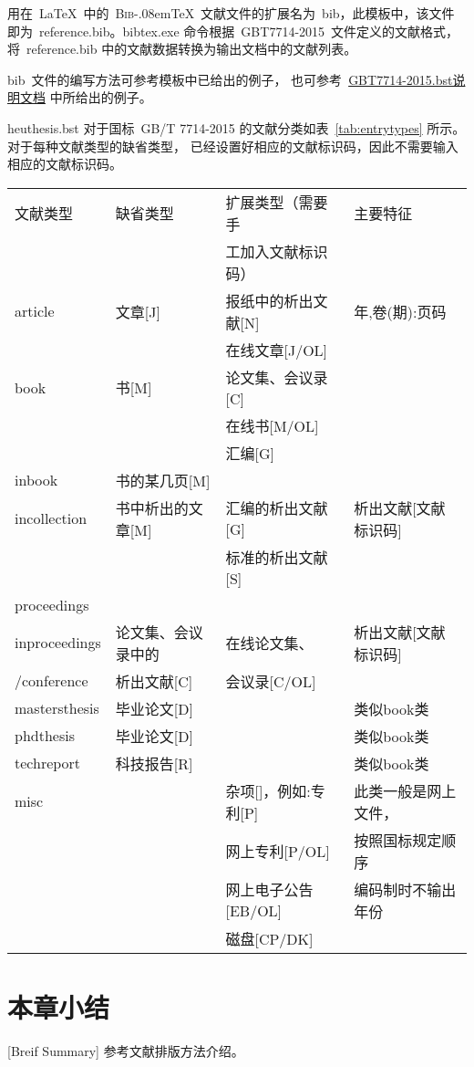 用在~\LaTeX~中的~\textsc{Bib}\kern-.08em\TeX~文献文件的扩展名为~bib，此模板中，该文件即为~reference.bib。bibtex.exe 命令根据~GBT7714-2015~文件定义的文献格式，将~reference.bib 中的文献数据转换为输出文档中的文献列表。

bib~文件的编写方法可参考模板中已给出的例子，
也可参考~\href{http://bbs.ctex.org/attachment.php?aid=MTk3OTd8NjY1ODc5OGV8MTMyNTY0MTEyMnxhZGZkYWpsa0I2RGZwNDR5Z1lyeStjb1dKRS8rTnJub3lvT2FkNDNJbHl1UWVkVQ\%3D\%3D}{GBT7714-2015.bst说明文档} 中所给出的例子。


heuthesis.bst 对于国标~GB/T 7714-2015 的文献分类如表~\ref{tab:entrytypes} 所示。对于每种文献类型的缺省类型，
已经设置好相应的文献标识码，因此不需要输入相应的文献标识码。

\begin{table}[htbp]
\vspace{0.5em}\centering\wuhao
\begin{tabular}{llll}
\toprule[1.5pt]
文献类型 & 缺省类型 & 扩展类型（需要手 & 主要特征\\
 &  & 工加入文献标识码） & \\
\midrule[1pt]
article & 文章[J] & 报纸中的析出文献[N] & 年,卷(期):页码\\
 &  & 在线文章[J/OL] & \\
book & 书[M] & 论文集、会议录[C] & \\
 &  & 在线书[M/OL] & \\
 &  & 汇编[G] & \\
inbook & 书的某几页[M] &  & \\
incollection & 书中析出的文章[M] & 汇编的析出文献[G] & 析出文献[文献标识码]\\
 &  & 标准的析出文献[S] & \\
proceedings &  &  & \\
inproceedings & 论文集、会议录中的 & 在线论文集、 & 析出文献[文献标识码]\\
/conference & 析出文献[C] & 会议录[C/OL] & \\
mastersthesis & 毕业论文[D] &  & 类似book类\\
phdthesis & 毕业论文[D] &  & 类似book类\\
techreport & 科技报告[R] &  & 类似book类\\
misc &  & 杂项[]，例如:专利[P] & 此类一般是网上文件，\\
 &  & 网上专利[P/OL] & 按照国标规定顺序\\
 &  & 网上电子公告[EB/OL] & 编码制时不输出年份\\
 &  & 磁盘[CP/DK] & \\
\bottomrule[1.5pt]
\end{tabular}
\end{table}

\section*{本章小结}[Breif Summary]
参考文献排版方法介绍。
